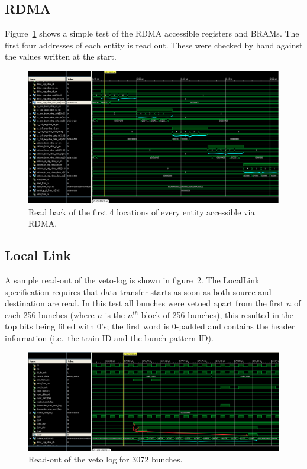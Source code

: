 \subsection{RDMA} %
\label{sec:rdma}
Figure~\ref{fig:isim_rdma} shows a simple test of the RDMA accessible registers and BRAMs. The first four addresses of each entity is read out. These were checked by hand against the values written at the start.
\begin{figure}
  \centering
  \includegraphics[width=\textwidth]{images/isim/edited/rdma.png}
  \caption{Read back of the first 4 locations of every entity accessible via RDMA.}
  \label{fig:isim_rdma}
\end{figure}
    
\clearpage
\subsection{Local Link} %
\label{sec:local_link}
A sample read-out of the veto-log is shown in figure~\ref{fig:isim_locallink}. The LocalLink specification requires that data transfer starts as soon as both source and destination are read. In this test all bunches were vetoed apart from the first \(n\) of each 256 bunches (where \( n\) is the \( n^{th} \) block of 256 bunches), this resulted in the top bits being filled with 0's; the first word is 0-padded and contains the header information (i.e.\ the train ID and the bunch pattern ID).
\begin{figure}
  \centering
  \includegraphics[width=\textwidth]{images/isim/edited/locallink.png}
  \caption{Read-out of the veto log for 3072 bunches.}
  \label{fig:isim_locallink}
\end{figure}
    
